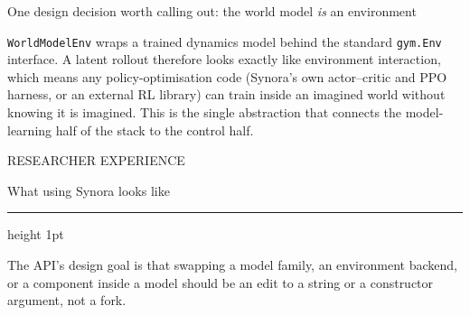 \documentclass[10pt,a4paper]{article}
\newcommand{\kicker}[1]{{\footnotesize\displayfont\color{accent}\MakeUppercase{#1}}}
\newcommand{\pagetitle}[2]{%
  \kicker{#1}\par\vspace{1.5mm}
  {\Huge\displayfont\color{ink} #2}\par\vspace{2.5mm}
  {\color{rule}\hrule height 1pt}\par\vspace{4mm}}
\newcommand{\subhead}[1]{{\displayfont\color{ink} #1}\par\vspace{1mm}}
\newcommand{\badge}[3]{\tcbox[on line,boxsep=0pt,left=3pt,right=3pt,top=1.4pt,bottom=1.4pt,
  boxrule=0pt,arc=2pt,colback=#1,coltext=#2]{\scriptsize\displayfont\MakeUppercase{#3}}}
\newcommand{\bimpl}{\badge{greensoft}{green}{implemented}}
\begin{document}
\vspace{2.5mm}
\begin{callout}
{\footnotesize
\subhead{One design decision worth calling out: the world model \emph{is} an environment}
\texttt{WorldModelEnv} wraps a trained dynamics model behind the standard \texttt{gym.Env}
interface. A latent rollout therefore looks exactly like environment interaction, which means any
policy-optimisation code (Synora's own actor–critic and PPO harness, or an external RL library)
can train inside an imagined world without knowing it is imagined. This is the single abstraction
that connects the model-learning half of the stack to the control half. \bimpl}
\end{callout}

\newpage
\pagetitle{Researcher experience}{What using Synora looks like}

{\footnotesize
The API's design goal is that swapping a model family, an environment backend, or a component
inside a model should be an edit to a string or a constructor argument, not a fork.}

\vspace{3.5mm}
\end{document}

